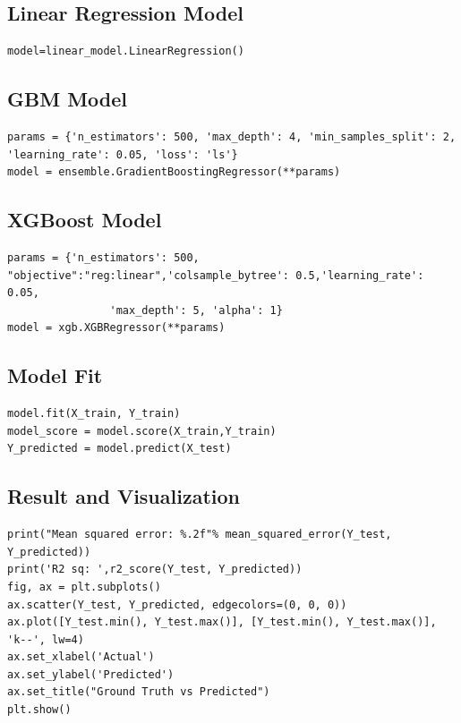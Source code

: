 \documentclass[a4paper]{article}
\begin{document}
\subsection*{Linear Regression Model}
\begin{verbatim}
model=linear_model.LinearRegression()
\end{verbatim}
\subsection*{GBM Model}
\begin{verbatim}
params = {'n_estimators': 500, 'max_depth': 4, 'min_samples_split': 2, 'learning_rate': 0.05, 'loss': 'ls'}
model = ensemble.GradientBoostingRegressor(**params)
\end{verbatim}
\subsection*{XGBoost Model}
\begin{verbatim}
params = {'n_estimators': 500, "objective":"reg:linear",'colsample_bytree': 0.5,'learning_rate': 0.05,
                'max_depth': 5, 'alpha': 1}
model = xgb.XGBRegressor(**params)
\end{verbatim}
\subsection*{Model Fit}
\begin{verbatim}
model.fit(X_train, Y_train)
model_score = model.score(X_train,Y_train)
Y_predicted = model.predict(X_test)
\end{verbatim}
\subsection*{Result and Visualization}
\begin{verbatim}
print("Mean squared error: %.2f"% mean_squared_error(Y_test, Y_predicted))
print('R2 sq: ',r2_score(Y_test, Y_predicted))
fig, ax = plt.subplots()
ax.scatter(Y_test, Y_predicted, edgecolors=(0, 0, 0))
ax.plot([Y_test.min(), Y_test.max()], [Y_test.min(), Y_test.max()], 'k--', lw=4)
ax.set_xlabel('Actual')
ax.set_ylabel('Predicted')
ax.set_title("Ground Truth vs Predicted")
plt.show()
\end{verbatim}
\end{document}
